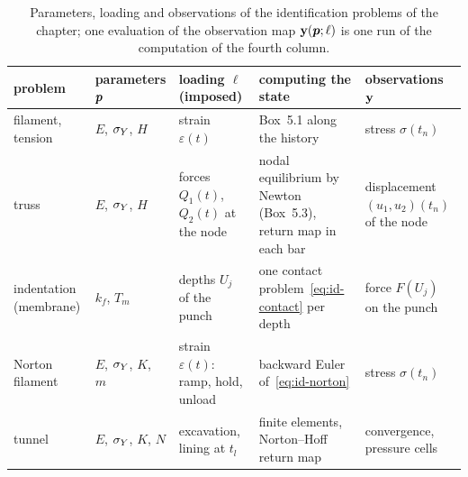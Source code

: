 \begin{table}[h]
\centering\small
\renewcommand{\arraystretch}{1.2}
\begin{tabular}{@{}>{\raggedright}p{2.1cm}>{\raggedright}p{1.9cm}>{\raggedright}p{2.6cm}>{\raggedright}p{4.6cm}p{2.9cm}@{}}
\toprule
\sffamily problem & \sffamily parameters $\bm{p}$ & \sffamily loading $\ell$ (imposed) & \sffamily computing the state & \sffamily observations $\mathbf{y}$\\
\midrule
filament, tension & $E$, $\sigma_{Y}$, $H$ & strain $\varepsilon(t)$ & Box~5.1 along the history & stress $\sigma(t_n)$\\
truss & $E$, $\sigma_{Y}$, $H$ & forces $Q_1(t)$, $Q_2(t)$ at the node & nodal equilibrium by Newton (Box~5.3), return map in each bar & displacement $(u_1,u_2)(t_n)$ of the node\\
indentation (membrane) & $k_f$, $T_m$ & depths $U_j$ of the punch & one contact problem~\eqref{eq:id-contact} per depth & force $F(U_j)$ on the punch\\
Norton filament & $E$, $\sigma_{Y}$, $K$, $m$ & strain $\varepsilon(t)$: ramp, hold, unload & backward Euler of~\eqref{eq:id-norton} & stress $\sigma(t_n)$\\
tunnel~\cite{LecampionConstantinescuNguyen2002} & $E$, $\sigma_{Y}$, $K$, $N$ & excavation, lining at $t_l$ & finite elements, Norton--Hoff return map & convergence, pressure cells\\
\bottomrule
\end{tabular}
\caption{Parameters, loading and observations of the identification problems of
the chapter; one evaluation of the observation map $\mathbf{y}(\bm{p};\ell)$ is one run
of the computation of the fourth column.}
\label{tab:id-problems}
\end{table}


